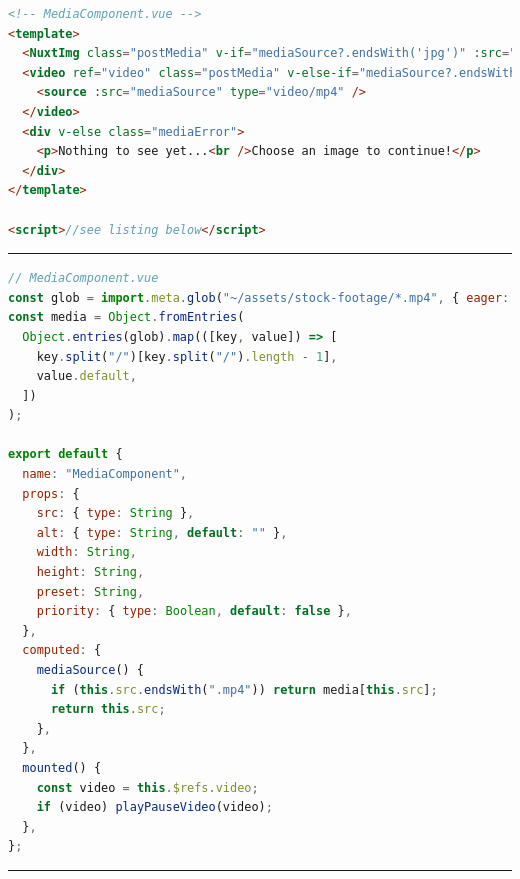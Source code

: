\documentclass[a4paper, 12pt]{article}
\begin{document}
\begin{lstlisting}[caption=MediaComponent in Nuxt (Template), label={lst:Nuxt:MediaComponent:Template}, language=HTML]
<!-- MediaComponent.vue -->
<template>
  <NuxtImg class="postMedia" v-if="mediaSource?.endsWith('jpg')" :src="mediaSource" :alt="alt" :preset="preset" :loading="priority ? 'eager' : 'lazy'" :preload="priority" :width="$config.public.image_presets[preset].modifiers.width" :height="$config.public.image_presets[preset].modifiers.height"/>
  <video ref="video" class="postMedia" v-else-if="mediaSource?.endsWith('mp4')" :width="width" preload="metadata" controls controlslist="nodownload,nofullscreen,noremoteplayback" disablepictureinpicture loop muted >
    <source :src="mediaSource" type="video/mp4" />
  </video>
  <div v-else class="mediaError">
    <p>Nothing to see yet...<br />Choose an image to continue!</p>
  </div>
</template>

<script>//see listing below</script>
\end{lstlisting}

\vspace{0.5cm} \hrule \vspace{0.5cm}

\begin{lstlisting}[caption=MediaComponent in Nuxt (Script), label={lst:Nuxt:MediaComponent:Script}, language=JavaScript, firstnumber=13, escapechar=°]
// MediaComponent.vue
const glob = import.meta.glob("~/assets/stock-footage/*.mp4", { eager: true });°\label{line:Nuxt:MediaComponent:imageImport}°
const media = Object.fromEntries(
  Object.entries(glob).map(([key, value]) => [
    key.split("/")[key.split("/").length - 1],
    value.default,
  ])
);

export default {
  name: "MediaComponent",
  props: {
    src: { type: String },
    alt: { type: String, default: "" },
    width: String,
    height: String,
    preset: String,
    priority: { type: Boolean, default: false },
  },
  computed: {
    mediaSource() {
      if (this.src.endsWith(".mp4")) return media[this.src];
      return this.src;
    },
  },
  mounted() {
    const video = this.$refs.video;
    if (video) playPauseVideo(video);
  },
};
\end{lstlisting}

\vspace{0.5cm} \hrule \vspace{0.5cm}
\end{document}
